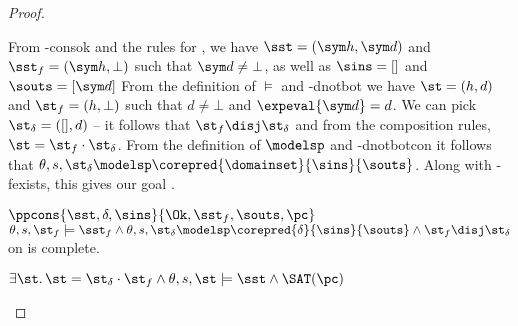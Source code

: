 \begin{proof}
\pfcase{$\delta = \domainset$}

\begin{hypvlist}
 From \hyp{consok} and the rules for \consume{}, we have $\sst=(\sym h,\sym d)$ and $\sst_f=(\sym h,\bot)$ such that $\sym d\neq\bot$, as well as $\sins=[]$ and $\souts=[\sym d]$
 From the definition of $\models$ and \hyp{dnotbot} we have $\st=(h,d)$ and $\st_f=(h,\bot)$ such that $d\neq\bot$ and $\expeval{\sym d}=d$.
 We can pick $\st_\delta=([],d)$ -- it follows that $\st_f\disj\st_\delta$ and from the composition rules, $\st=\st_f\cdot\st_\delta$.
 From the definition of $\modelsp$ and \hyp{dnotbotcon} it follows that $\theta,s,\st_\delta\modelsp\corepred{\domainset}{\sins}{\souts}$. Along with \hyp{fexists}, this gives our goal .
\end{hypvlist}


\pfassume \begin{hypvlist}
 $\ppcons{\sst,\delta,\sins}{\Ok,\sst_f,\souts,\pc}$
 $\theta,s,\st_f\models \sst_f \land \theta, s, \st_\delta \modelsp \corepred{\delta}{\sins}{\souts} \land \st_f\disj\st_\delta$
 \consume{} on \mmdl{} is complete.
\end{hypvlist}
\pfprove \begin{goalvlist}
 $\exists \st\ldotp \st = \st_\delta \cdot \st_f \land \theta,s,\st\models \sst \land \SAT(\pc)$
\end{goalvlist}

\pfcase{$\delta \in \preds_\mmdl$}


\end{proof}
